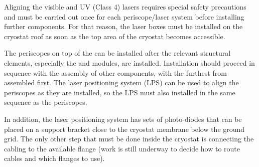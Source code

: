 
Aligning the visible and UV (Class 4) lasers requires special safety precautions and must be carried out once for each periscope/laser system before installing further  components. For that reason, the laser boxes must be installed on the cryostat roof as soon as the top area of the cryostat becomes accessible. 

The periscopes on top of the  can be installed after the relevant structural elements, especially the  and  modules, are installed. Installation should proceed in sequence with the assembly of other components, with the furthest from  assembled first. The laser positioning system (LPS)  can be used to align the periscopes as they are installed, so the LPS must also installed in the same sequence as the periscopes. %

In addition, the laser positioning system has sets of photo-diodes  that can be
placed on a support bracket close to the cryostat membrane below the ground grid. The only other step that must be done inside the cryostat
is connecting the cabling to the available flange (work is still underway to decide how to route cables and which flanges to use).



